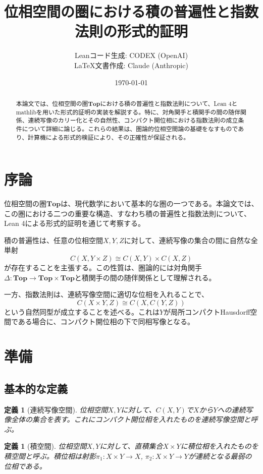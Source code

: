 \documentclass[uplatex, a4paper]{jlreq}
\title{位相空間の圏における積の普遍性と指数法則の形式的証明}
\author{Leanコード生成: CODEX (OpenAI)\\LaTeX文書作成: Claude (Anthropic)}
\date{\today}
\newtheorem{definition}[theorem]{定義}
\newcommand{\Top}{\mathbf{Top}}
\begin{document}
\maketitle

\begin{abstract}
本論文では、位相空間の圏$\Top$における積の普遍性と指数法則について、Lean 4とmathlibを用いた形式的証明の実装を解説する。特に、対角関手と積関手の間の随伴関係、連続写像のカリー化とその自然性、コンパクト開位相における指数法則の成立条件について詳細に論じる。これらの結果は、圏論的位相空間論の基礎をなすものであり、計算機による形式的検証により、その正確性が保証される。
\end{abstract}

\section{序論}

位相空間の圏$\Top$は、現代数学において基本的な圏の一つである。本論文では、この圏における二つの重要な構造、すなわち積の普遍性と指数法則について、Lean 4による形式的証明を通じて考察する。

積の普遍性は、任意の位相空間$X, Y, Z$に対して、連続写像の集合の間に自然な全単射
\[
C(X, Y \times Z) \cong C(X, Y) \times C(X, Z)
\]
が存在することを主張する。この性質は、圏論的には対角関手$\Delta: \Top \to \Top \times \Top$と積関手の間の随伴関係として理解される。

一方、指数法則は、連続写像空間に適切な位相を入れることで、
\[
C(X \times Y, Z) \cong C(X, C(Y, Z))
\]
という自然同型が成立することを述べる。これは$Y$が局所コンパクトHausdorff空間である場合に、コンパクト開位相の下で同相写像となる。

\section{準備}

\subsection{基本的な定義}

\begin{definition}[連続写像空間]
位相空間$X, Y$に対して、$C(X, Y)$で$X$から$Y$への連続写像全体の集合を表す。これにコンパクト開位相を入れたものを連続写像空間と呼ぶ。
\end{definition}

\begin{definition}[積空間]
位相空間$X, Y$に対して、直積集合$X \times Y$に積位相を入れたものを積空間と呼ぶ。積位相は射影$\pi_1: X \times Y \to X$, $\pi_2: X \times Y \to Y$が連続となる最弱の位相である。
\end{definition}
\end{document}

